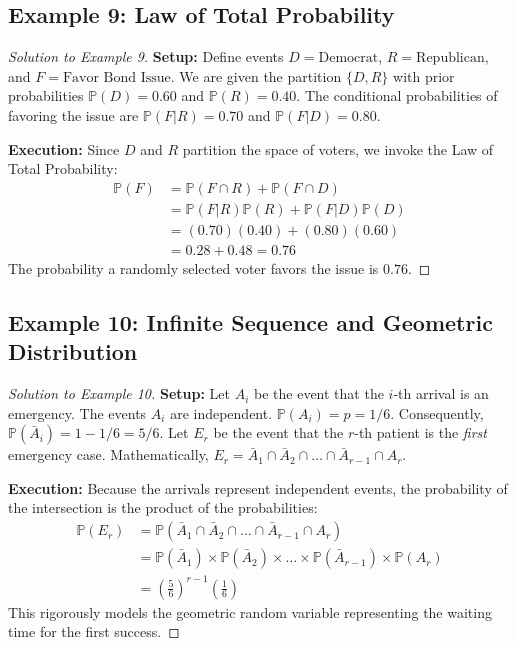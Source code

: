 \documentclass[12pt, a4paper]{article}
\theoremstyle{definition}
\theoremstyle{remark}
\newcommand{\Prob}{\mathbb{P}}
\newcommand{\1}{\mathbf{1}}
\begin{document}
\subsection*{Example 9: Law of Total Probability}
\begin{proof}[Solution to Example 9]
\textbf{Setup:} Define events $D = \text{Democrat}$, $R = \text{Republican}$, and $F = \text{Favor Bond Issue}$. 
We are given the partition $\{D, R\}$ with prior probabilities $\Prob(D) = 0.60$ and $\Prob(R) = 0.40$.
The conditional probabilities of favoring the issue are $\Prob(F|R) = 0.70$ and $\Prob(F|D) = 0.80$.

\textbf{Execution:}
Since $D$ and $R$ partition the space of voters, we invoke the Law of Total Probability:
\begin{align*}
\Prob(F) &= \Prob(F \cap R) + \Prob(F \cap D) \\
&= \Prob(F|R)\Prob(R) + \Prob(F|D)\Prob(D) \\
&= (0.70)(0.40) + (0.80)(0.60) \\
&= 0.28 + 0.48 = 0.76
\end{align*}
The probability a randomly selected voter favors the issue is $0.76$.
\end{proof}

\subsection*{Example 10: Infinite Sequence and Geometric Distribution}
\begin{proof}[Solution to Example 10]
\textbf{Setup:} Let $A_i$ be the event that the $i$-th arrival is an emergency. The events $A_i$ are independent. $\Prob(A_i) = p = 1/6$. Consequently, $\Prob(\bar{A}_i) = 1 - 1/6 = 5/6$.
Let $E_r$ be the event that the $r$-th patient is the \textit{first} emergency case. 
Mathematically, $E_r = \bar{A}_1 \cap \bar{A}_2 \cap \dots \cap \bar{A}_{r-1} \cap A_r$.

\textbf{Execution:}
Because the arrivals represent independent events, the probability of the intersection is the product of the probabilities:
\begin{align*}
\Prob(E_r) &= \Prob(\bar{A}_1 \cap \bar{A}_2 \cap \dots \cap \bar{A}_{r-1} \cap A_r) \\
&= \Prob(\bar{A}_1) \times \Prob(\bar{A}_2) \times \dots \times \Prob(\bar{A}_{r-1}) \times \Prob(A_r) \\
&= \left(\frac{5}{6}\right)^{r-1} \left(\frac{1}{6}\right)
\end{align*}
This rigorously models the geometric random variable representing the waiting time for the first success.
\end{proof}
\end{document}
